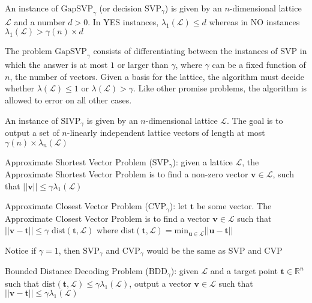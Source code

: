 \begin{definition}
\normalfont
An instance of $\text{GapSVP}_{\gamma}$ (or decision $\text{SVP}_{\gamma}$) is given by an $n$-dimensional lattice $\mathcal{L}$ and a number $d > 0$. In YES instances, $\lambda_{1}(\mathcal{L}) \le d$ whereas in NO instances $\lambda_1(\mathcal{L}) > \gamma(n)\times d$
\end{definition}

The problem ${\text{GapSVP}_{\gamma}}$ consists of differentiating between the instances of $\text{SVP}$ in which the answer is at most $1$ or larger than $\gamma$, where $\gamma$ can be a fixed function of $n$, the number of vectors. Given a basis for the lattice, the algorithm must decide whether $\lambda(\mathcal{L})\leq 1$ or $\lambda (\mathcal{L})>\gamma$. Like other promise problems, the algorithm is allowed to error on all other cases.

\begin{definition}
\normalfont
An instance of $\text{SIVP}_{\gamma}$ is given by an $n$-dimensional lattice $\mathcal{L}$. The goal is to output a set of $n$-linearly independent lattice vectors of length at most $\gamma(n) \times \lambda_{n}(\mathcal{L})$
\end{definition}


\begin{definition}
\normalfont
Approximate Shortest Vector Problem ($\text{SVP}_{\gamma}$): given a lattice $\mathcal{L}$, the Approximate Shortest Vector Problem is to find a non-zero vector $\textbf{v} \in \mathcal{L}$, such that $||\textbf{v}|| \le \gamma \lambda_1 (\mathcal{L})$
\end{definition}


\begin{definition}
\normalfont
Approximate Closest Vector Problem ($\text{CVP}_{\gamma}$): let $\textbf{t}$ be some vector. The Approximate Closest Vector Problem is to find a vector $\textbf{v} \in \mathcal{L}$ such that $||\textbf{v} - \textbf{t}|| \le \gamma \text{ dist}(\textbf{t}, \mathcal{L})$ where $\text{dist}(\textbf{t}, \mathcal{L}) = \text{min}_{\textbf{u} \in \mathcal{L}} ||\textbf{u} - \textbf{t}||$
\end{definition}

Notice if $\gamma = 1$, then $\text{SVP}_{\gamma}$ and $\text{CVP}_{\gamma}$ would be the same as SVP and CVP

\begin{definition}
\normalfont
Bounded Distance Decoding Problem ($\text{BDD}_{\gamma}$): given $\mathcal{L}$ and a target point $\textbf{t} \in \mathbb{R}^{n}$ such that $\text{dist}(\textbf{t}, \mathcal{L}) \le \gamma \lambda_1(\mathcal{L})$, output a vector $\textbf{v} \in \mathcal{L}$ such that $||\textbf{v} - \textbf{t}|| \le \gamma \lambda_1(\mathcal{L})$
\end{definition}



